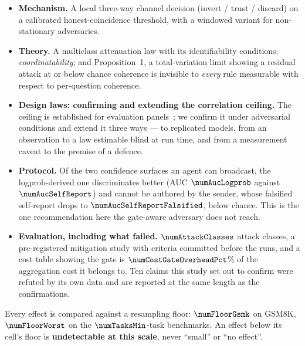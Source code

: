\begin{itemize}
\item \textbf{Mechanism.} A local three-way channel decision (invert / trust /
      discard) on a calibrated honest-coincidence threshold, with a windowed
      variant for non-stationary adversaries.
\item \textbf{Theory.} A multiclass attenuation law with its identifiability
      conditions; \emph{coordinatability}; and Proposition~1, a total-variation
      limit showing a residual attack at or below chance coherence is invisible
      to \emph{every} rule measurable with respect to per-question coherence.
\item \textbf{Design laws: confirming and extending the correlation ceiling.}
      The ceiling is established for evaluation
      panels~\cite{judgecorr,panelcorr,hivemind}; we confirm it under adversarial
      conditions and extend it three ways --- to replicated models, from an
      observation to a law estimable blind at run time, and from a measurement
      caveat to the premise of a defence.
\item \textbf{Protocol.} Of the two confidence surfaces an agent can broadcast,
      the logprob-derived one discriminates better (AUC $\numAucLogprob$ against
      $\numAucSelfReport$) and cannot be authored by the sender, whose falsified
      self-report drops to $\numAucSelfReportFalsified$, below chance. This is
      the one recommendation here the gate-aware adversary does not reach.
\item \textbf{Evaluation, including what failed.} $\numAttackClasses$ attack
      classes, a pre-registered mitigation study with criteria committed before
      the runs, and a cost table showing the gate is
      $\numCostGateOverheadPct$\% of the aggregation cost it belongs to. Ten
      claims this study set out to confirm were refuted by its own data and are
      reported at the same length as the confirmations.
\end{itemize}

Every effect is compared against a resampling floor: $\numFloorGsmk$ on GSM8K,
$\numFloorWorst$ on the $\numTasksMin$-task benchmarks. An effect below its
cell's floor is \textbf{undetectable at this scale}, never ``small'' or ``no
effect''.

